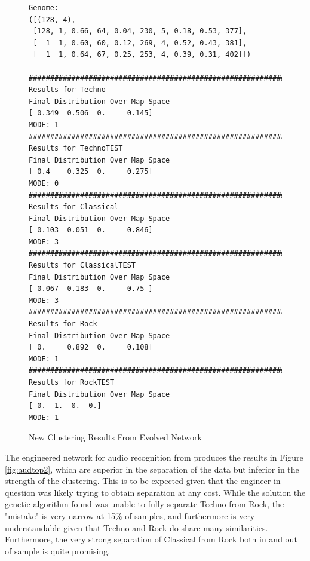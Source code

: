 \documentclass[12pt,a4paper]{article}
\begin{document}
\begin{figure}[H]
\caption{New Clustering Results From Evolved Network}
\label{fig:aud}

\begin{lstlisting}
Genome:
([(128, 4),
 [128, 1, 0.66, 64, 0.04, 230, 5, 0.18, 0.53, 377],
 [  1  1, 0.60, 60, 0.12, 269, 4, 0.52, 0.43, 381],
 [  1  1, 0.64, 67, 0.25, 253, 4, 0.39, 0.31, 402]])
  
################################################################################
Results for Techno
Final Distribution Over Map Space
[ 0.349  0.506  0.     0.145]
MODE: 1
################################################################################
Results for TechnoTEST
Final Distribution Over Map Space
[ 0.4    0.325  0.     0.275]
MODE: 0
################################################################################
Results for Classical
Final Distribution Over Map Space
[ 0.103  0.051  0.     0.846]
MODE: 3
################################################################################
Results for ClassicalTEST
Final Distribution Over Map Space
[ 0.067  0.183  0.     0.75 ]
MODE: 3
################################################################################
Results for Rock
Final Distribution Over Map Space
[ 0.     0.892  0.     0.108]
MODE: 1
################################################################################
Results for RockTEST
Final Distribution Over Map Space
[ 0.  1.  0.  0.]
MODE: 1
\end{lstlisting}
\end{figure}
The engineered network for audio recognition from \cite{MLPaper} produces the results in Figure \ref{fig:audtop2}, which are superior in the separation of the data but inferior in the strength of the clustering.  This is to be expected given that the engineer in question was likely trying to obtain separation at any cost.  While the solution the genetic algorithm found was unable to fully separate Techno from Rock, the "mistake" is very narrow at 15\% of samples, and furthermore is very understandable given that Techno and Rock do share many similarities. Furthermore, the very strong separation of Classical from Rock both in and out of sample is quite promising.
\end{document}
